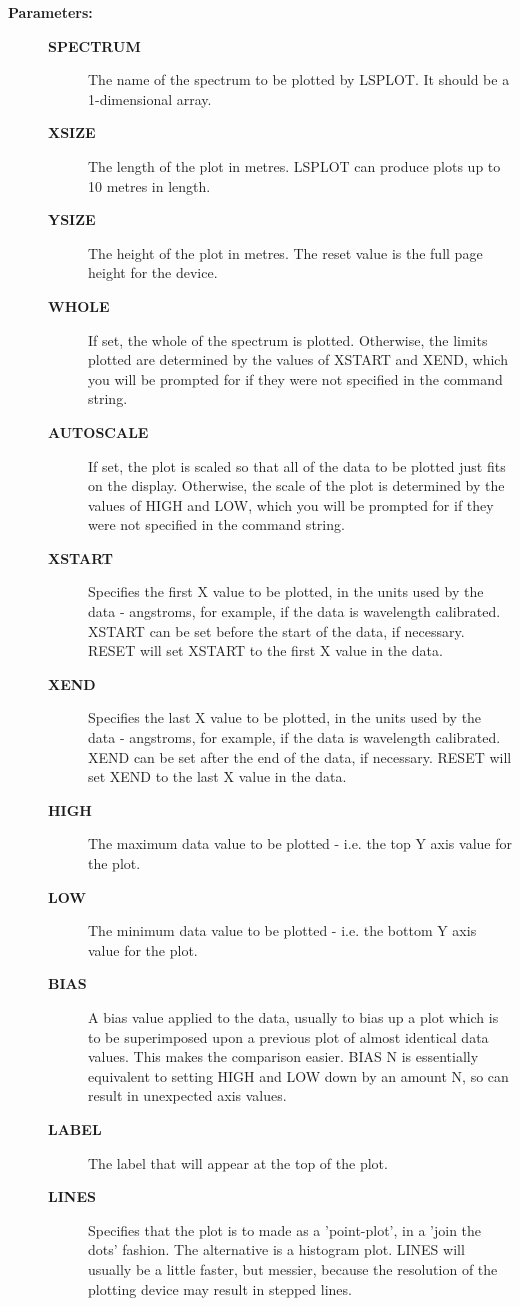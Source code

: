\begin{description}
\item [{\bf Parameters:}]
\begin{description}
\item [{\bf SPECTRUM}]
 The name of the spectrum to be plotted by LSPLOT.
 It should be a 1-dimensional array.
\item [{\bf XSIZE}]
 The length of the plot in metres.  LSPLOT
 can produce plots up to 10 metres in length.
\item [{\bf YSIZE}]
 The height of the plot in metres.  The reset
 value is the full page height for the device.
\item [{\bf WHOLE}]
 If set, the whole of the spectrum is plotted.
 Otherwise, the limits plotted are determined by the values of
 XSTART and XEND, which you will be prompted for if they were
 not specified in the command string.
\item [{\bf AUTOSCALE}]
 If set, the plot is scaled so that all of the data to be
 plotted just fits on the display.  Otherwise, the scale
 of the plot is determined by the values of HIGH and LOW,
 which you will be prompted for if they were not specified
 in the command string.
\item [{\bf XSTART}]
 Specifies the first X value to be plotted, in the
 units used by the data - angstroms, for example, if the data
 is wavelength calibrated.  XSTART can be set before the start
 of the data, if necessary.  RESET will set XSTART to the first
 X value in the data.
\item [{\bf XEND}]
 Specifies the last X value to be plotted, in the units
 used by the data - angstroms, for example, if the data
 is wavelength calibrated.  XEND can be set after the end
 of the data, if necessary.  RESET will set XEND to the last
 X value in the data.
\item [{\bf HIGH}]
 The maximum data value to be plotted - i.e. the top
 Y axis value for the plot.
\item [{\bf LOW}]
 The minimum data value to be plotted - i.e. the bottom
 Y axis value for the plot.
\item [{\bf BIAS}]
 A bias value applied to the data, usually to bias
 up a plot which is to be superimposed upon a previous plot
 of almost identical data values.  This makes the comparison
 easier.  BIAS N  is essentially equivalent to setting HIGH
 and LOW down by an amount N, so can result in unexpected
 axis values.
\item [{\bf LABEL}]
 The label that will appear at the top of the plot.
\item [{\bf LINES}]
 Specifies that the plot is to made as a 'point-plot',
 in a 'join the dots' fashion.  The alternative is a histogram
 plot.  LINES will usually be a little faster, but messier,
 because the resolution of the plotting device may result in
 stepped lines.
\end{description}


\end{description}
